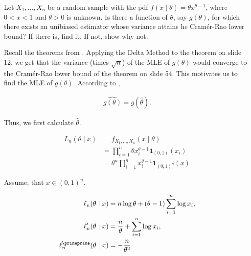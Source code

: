 
\begin{exercise}

Let $X_1, \dots, X_n$ be a random sample with the pdf $f(x \mid \theta) = \theta x^{\theta - 1}$, where $0 < x < 1$ and $\theta > 0$ is unknown.
Is there a function of $\theta$, say $g(\theta)$, for which there exists an unibiased estimator whose variance attains he Cramér-Rao lower bound?
If there is, find it.
If not, show why not.

\end{exercise}


\begin{solution}

Recall the theorems from \cite[lecture 7, slides 12, 54]{EStat}.
Applying the Delta Method to the theorem on slide 12, we get that the variance (times $\sqrt n$) of the MLE of $g(\theta)$ would converge to the Cramér-Rao lower bound of the theorem on slide 54.
This motivates us to find the MLE of $g(\theta)$.
According to \cite[lecture 7, slide 46]{EStat},

\begin{align*}
    \widehat{g(\theta)} = g(\hat \theta).
\end{align*}

Thus, we first calculate $\hat \theta$.

\begin{align*}
    L_n(\theta \mid x)
    & =
    f_{X_1, \dots, X_n}(x \mid \theta) \\
    & =
    \prod_{i=1}^n
        \theta x_i^{\theta - 1} \mathbf 1_{(0, 1)}(x_i) \\
    & =
    \theta^n
    \prod_{i=1}^n
        x_i^{\theta - 1}
    \mathbf 1_{(0, 1)^n}(x)
\end{align*}

Assume, that $x \in (0, 1)^n$.

\begin{align*}
    \ell_n(\theta \mid x)
    & =
    n \log \theta + (\theta - 1) \sum_{i=1}^n \log x_i, \\
    \ell_n^\prime(\theta \mid x)
    & =
    \frac{n}{\theta} + \sum_{i=1}^n \log x_i, \\
    \ell_n^\primeprime(\theta \mid x)
    & =
    -\frac{n}{\theta^2}
\end{align*}


\end{solution}
